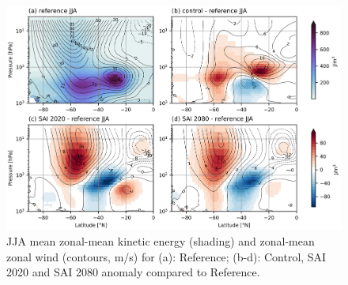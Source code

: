 \begin{figure}[H]
	\centering
	\includegraphics[width=0.95\linewidth]{images/KE_U_zmdiff_JJA.png}
	\caption{JJA mean zonal-mean kinetic energy (shading) and zonal-mean zonal wind (contours, m/s) for (a): Reference; (b-d): Control, SAI 2020 and SAI 2080 anomaly compared to Reference.}
	\label{fig:KE_U_zmdiff_JJA}
\end{figure}

